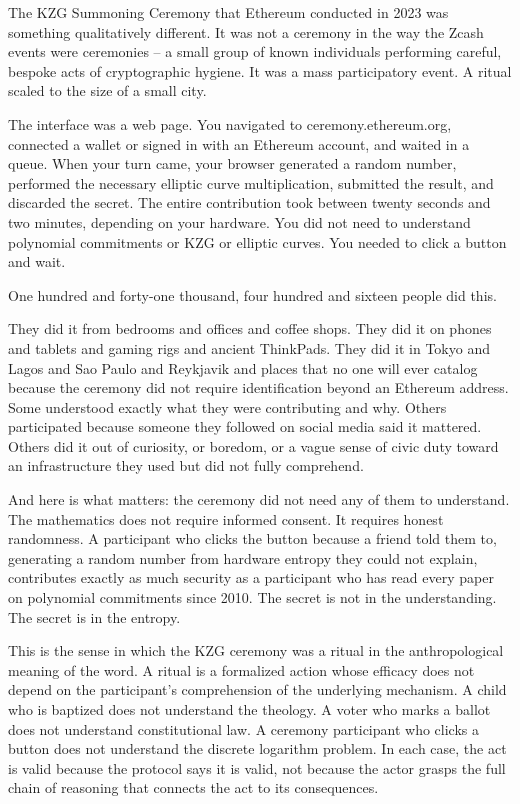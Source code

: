 \documentclass[
  11pt,
  openany]{report}
\begin{document}
The KZG Summoning Ceremony that Ethereum conducted in 2023 was something
qualitatively different. It was not a ceremony in the way the Zcash events were
ceremonies -- a small group of known individuals performing careful, bespoke
acts of cryptographic hygiene. It was a mass participatory event. A ritual
scaled to the size of a small city.

The interface was a web page. You navigated to ceremony.ethereum.org, connected
a wallet or signed in with an Ethereum account, and waited in a queue. When your
turn came, your browser generated a random number, performed the necessary
elliptic curve multiplication, submitted the result, and discarded the secret.
The entire contribution took between twenty seconds and two minutes, depending
on your hardware. You did not need to understand polynomial commitments or KZG
or elliptic curves. You needed to click a button and wait.

One hundred and forty-one thousand, four hundred and sixteen people did this.

They did it from bedrooms and offices and coffee shops. They did it on phones
and tablets and gaming rigs and ancient ThinkPads. They did it in Tokyo and
Lagos and Sao Paulo and Reykjavik and places that no one will ever catalog
because the ceremony did not require identification beyond an Ethereum address.
Some understood exactly what they were contributing and why. Others participated
because someone they followed on social media said it mattered. Others did it
out of curiosity, or boredom, or a vague sense of civic duty toward an
infrastructure they used but did not fully comprehend.

And here is what matters: the ceremony did not need any of them to understand.
The mathematics does not require informed consent. It requires honest
randomness. A participant who clicks the button because a friend told them to,
generating a random number from hardware entropy they could not explain,
contributes exactly as much security as a participant who has read every paper
on polynomial commitments since 2010. The secret is not in the understanding.
The secret is in the entropy.

This is the sense in which the KZG ceremony was a ritual in the anthropological
meaning of the word. A ritual is a formalized action whose efficacy does not
depend on the participant's comprehension of the underlying mechanism. A child
who is baptized does not understand the theology. A voter who marks a ballot
does not understand constitutional law. A ceremony participant who clicks a
button does not understand the discrete logarithm problem. In each case, the act
is valid because the protocol says it is valid, not because the actor grasps the
full chain of reasoning that connects the act to its consequences.
\end{document}
